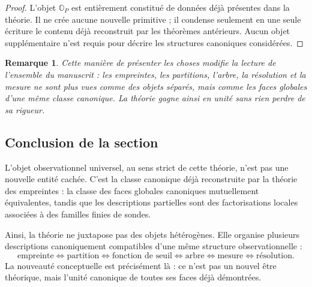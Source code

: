 \documentclass[11pt,a4paper,openany]{book}
\newtheorem{remark}[definition]{Remarque}
\begin{document}
\begin{proof}
L'objet \(\mathbb O_P\) est entièrement constitué de données déjà présentes dans la théorie. Il ne crée aucune nouvelle primitive ; il condense seulement en une seule écriture le contenu déjà reconstruit par les théorèmes antérieurs. Aucun objet supplémentaire n'est requis pour décrire les structures canoniques considérées.
\end{proof}

\begin{remark}
Cette manière de présenter les choses modifie la lecture de l'ensemble du manuscrit : les empreintes, les partitions, l'arbre, la résolution et la mesure ne sont plus vues comme des objets séparés, mais comme les faces globales d'une même classe canonique. La théorie gagne ainsi en unité sans rien perdre de sa rigueur.
\end{remark}

\subsection{Conclusion de la section}

L'objet observationnel universel, au sens strict de cette théorie, n'est pas une nouvelle entité cachée.  
C'est la classe canonique déjà reconstruite par la théorie des empreintes : la classe des faces globales canoniques mutuellement équivalentes, tandis que les descriptions partielles sont des factorisations locales associées à des familles finies de sondes.

Ainsi, la théorie ne juxtapose pas des objets hétérogènes. Elle organise plusieurs descriptions canoniquement compatibles d'une même structure observationnelle :
\[
\text{empreinte}
\Longleftrightarrow
\text{partition}
\Longleftrightarrow
\text{fonction de seuil}
\Longleftrightarrow
\text{arbre}
\Longleftrightarrow
\text{mesure}
\Longleftrightarrow
\text{résolution}.
\]
La nouveauté conceptuelle est précisément là : ce n'est pas un nouvel être théorique, mais l'unité canonique de toutes ses faces déjà démontrées.


%









%
\end{document}
